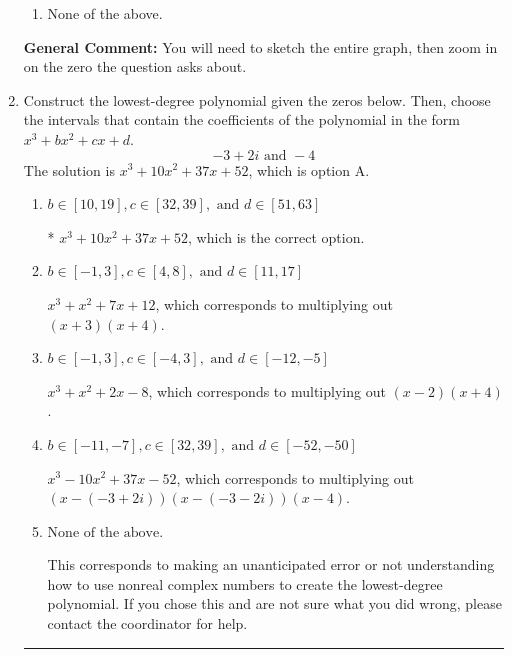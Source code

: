 \documentclass{extbook}[14pt]
\newcommand{\litem}[1]{\item #1

\rule{\textwidth}{0.4pt}}
\begin{document}
\begin{enumerate}
{\begin{enumerate}[label=\Alph*.]
\item None of the above.\end{enumerate}
\textbf{General Comment:} You will need to sketch the entire graph, then zoom in on the zero the question asks about.
}
\litem{
Construct the lowest-degree polynomial given the zeros below. Then, choose the intervals that contain the coefficients of the polynomial in the form $x^3+bx^2+cx+d$.
\[ -3 + 2 i \text{ and } -4 \]The solution is \( x^{3} +10 x^{2} +37 x + 52 \), which is option A.\begin{enumerate}[label=\Alph*.]
\item \( b \in [10, 19], c \in [32, 39], \text{ and } d \in [51, 63] \)

* $x^{3} +10 x^{2} +37 x + 52$, which is the correct option.
\item \( b \in [-1, 3], c \in [4, 8], \text{ and } d \in [11, 17] \)

$x^{3} + x^{2} +7 x + 12$, which corresponds to multiplying out $(x + 3)(x + 4)$.
\item \( b \in [-1, 3], c \in [-4, 3], \text{ and } d \in [-12, -5] \)

$x^{3} + x^{2} +2 x -8$, which corresponds to multiplying out $(x -2)(x + 4)$.
\item \( b \in [-11, -7], c \in [32, 39], \text{ and } d \in [-52, -50] \)

$x^{3} -10 x^{2} +37 x -52$, which corresponds to multiplying out $(x-(-3 + 2 i))(x-(-3 - 2 i))(x -4)$.
\item \( \text{None of the above.} \)

This corresponds to making an unanticipated error or not understanding how to use nonreal complex numbers to create the lowest-degree polynomial. If you chose this and are not sure what you did wrong, please contact the coordinator for help.
\end{enumerate}

}
\end{enumerate}
\end{document}
